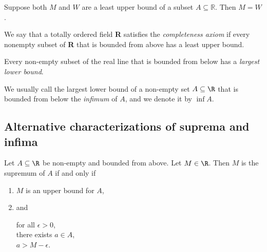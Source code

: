 \begin{proposition}
    Suppose both $M$ and $W$ are a least upper bound of a subset $A \subseteq \mathbb{R}$. Then $M = W$.
\end{proposition}

\begin{axiom}
    We say that a totally ordered field \textbf{R} satisfies the \emph{completeness axiom} if every nonempty subset of \textbf{R} that is bounded from above has a least upper bound.
\end{axiom}

\begin{lemma}
    Every non-empty subset of the real line that is bounded from below has a \emph{largest lower bound}.
\end{lemma}

\begin{definition}[infimum]
    We usually call the largest lower bound of a non-empty set $A \subseteq \R$ that is bounded from below the \emph{infimum} of $A$, and we denote it by $\inf A$.
\end{definition}

\subsection{Alternative characterizations of suprema and infima}
\begin{proposition}
    Let $A \subseteq \R$ be non-empty and bounded from above. Let $M \in \R$. Then $M$ is the supremum of $A$ if and only if
    \begin{enumerate}
        \item $M$ is an upper bound for $A$,
        \item and 
            \begin{center}
                \parbox{\linewidth}{
                    \linewidth
                    for all $\epsilon > 0$, \\
                    \tab there exists $a \in A$, \\
                    \tab\tab $a > M - \epsilon$.
                }
            \end{center}
    \end{enumerate}
\end{proposition}


